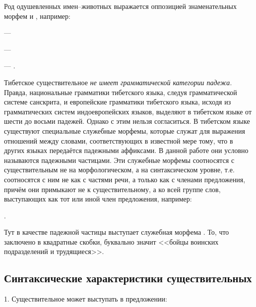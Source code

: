 Род одушевленных имен--животных выражается оппозицией знаменательных морфем  и , например:
\begin{prfsample}
    \item {} --- 
    \item {} --- 
    \item {} --- .
\end{prfsample}

\label{page71}Тибетское существительное \emph{не имеет грамматической категории падежа}. Правда, национальные грамматики тибетского языка, следуя грамматической системе санскрита, и европейские грамматики тибетского языка, исходя из грамматических систем индоевропейских языков, выделяют в тибетском языке от шести до восьми падежей. Однако с этим нельзя согласиться. В тибетском языке существуют специальные служебные морфемы, которые служат для выражения отношений между словами, соответствующих в известной мере тому, что в других языках передаётся падежными аффиксами. В данной работе они условно называются падежными частицами. Эти служебные морфемы соотносятся с существительным не на морфологическом, а на синтаксическом уровне, т.е. соотносятся с ним не как с частями речи, а только как с членами предложения, причём они примыкают не к существительному, а ко всей группе слов, выступающих как тот или иной член предложения, например:
\begin{prfsample}
    \item {}.
\end{prfsample}
Тут в качестве падежной частицы выступает
служебная морфема . То, что заключено в квадратные скобки, буквально значит <<бойцы воинских подразделений и трудящиеся>>.

\subsection{Синтаксические характеристики существительных}

1. Существительное может выступать в предложении:

